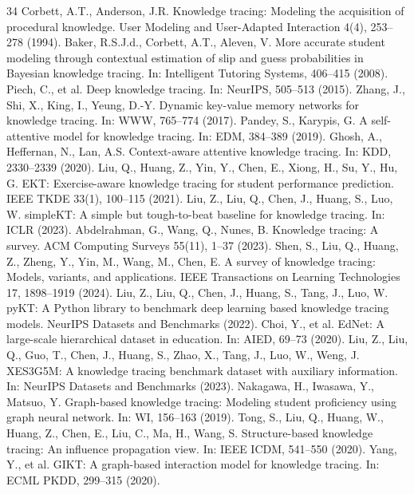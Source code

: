\documentclass[11pt,a4paper]{article}
\begin{document}
\begin{thebibliography}{34}
 Corbett, A.T., Anderson, J.R. Knowledge tracing: Modeling the acquisition of procedural knowledge. User Modeling and User-Adapted Interaction 4(4), 253--278 (1994).
 Baker, R.S.J.d., Corbett, A.T., Aleven, V. More accurate student modeling through contextual estimation of slip and guess probabilities in Bayesian knowledge tracing. In: Intelligent Tutoring Systems, 406--415 (2008).
 Piech, C., et al. Deep knowledge tracing. In: NeurIPS, 505--513 (2015).
 Zhang, J., Shi, X., King, I., Yeung, D.-Y. Dynamic key-value memory networks for knowledge tracing. In: WWW, 765--774 (2017).
 Pandey, S., Karypis, G. A self-attentive model for knowledge tracing. In: EDM, 384--389 (2019).
 Ghosh, A., Heffernan, N., Lan, A.S. Context-aware attentive knowledge tracing. In: KDD, 2330--2339 (2020).
 Liu, Q., Huang, Z., Yin, Y., Chen, E., Xiong, H., Su, Y., Hu, G. EKT: Exercise-aware knowledge tracing for student performance prediction. IEEE TKDE 33(1), 100--115 (2021).
 Liu, Z., Liu, Q., Chen, J., Huang, S., Luo, W. simpleKT: A simple but tough-to-beat baseline for knowledge tracing. In: ICLR (2023).
 Abdelrahman, G., Wang, Q., Nunes, B. Knowledge tracing: A survey. ACM Computing Surveys 55(11), 1--37 (2023).
 Shen, S., Liu, Q., Huang, Z., Zheng, Y., Yin, M., Wang, M., Chen, E. A survey of knowledge tracing: Models, variants, and applications. IEEE Transactions on Learning Technologies 17, 1898--1919 (2024).
 Liu, Z., Liu, Q., Chen, J., Huang, S., Tang, J., Luo, W. pyKT: A Python library to benchmark deep learning based knowledge tracing models. NeurIPS Datasets and Benchmarks (2022).
 Choi, Y., et al. EdNet: A large-scale hierarchical dataset in education. In: AIED, 69--73 (2020).
 Liu, Z., Liu, Q., Guo, T., Chen, J., Huang, S., Zhao, X., Tang, J., Luo, W., Weng, J. XES3G5M: A knowledge tracing benchmark dataset with auxiliary information. In: NeurIPS Datasets and Benchmarks (2023).
 Nakagawa, H., Iwasawa, Y., Matsuo, Y. Graph-based knowledge tracing: Modeling student proficiency using graph neural network. In: WI, 156--163 (2019).
 Tong, S., Liu, Q., Huang, W., Huang, Z., Chen, E., Liu, C., Ma, H., Wang, S. Structure-based knowledge tracing: An influence propagation view. In: IEEE ICDM, 541--550 (2020).
 Yang, Y., et al. GIKT: A graph-based interaction model for knowledge tracing. In: ECML PKDD, 299--315 (2020).

\end{thebibliography}
\end{document}

